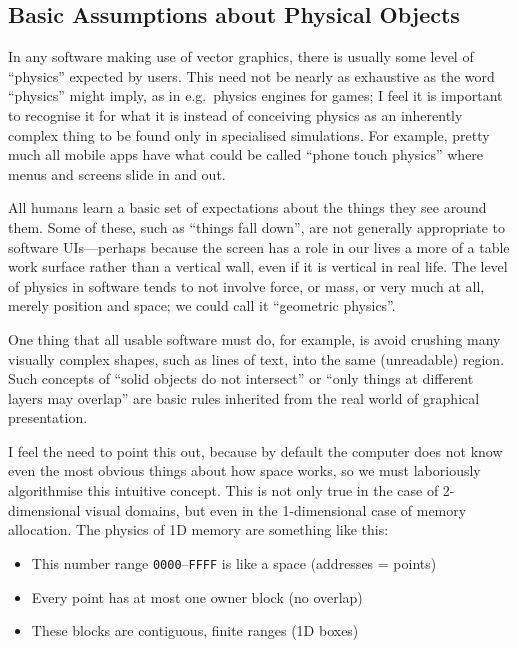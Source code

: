 \hypertarget{basic-assumptions-about-physical-objects}{%
\subsection{Basic Assumptions about Physical
Objects}\label{basic-assumptions-about-physical-objects}}

In any software making use of vector graphics, there is usually some
level of ``physics'' expected by users. This need not be nearly as
exhaustive as the word ``physics'' might imply, as in e.g.~physics
engines for games; I feel it is important to recognise it for what it is
instead of conceiving physics as an inherently complex thing to be found
only in specialised simulations. For example, pretty much all mobile
apps have what could be called ``phone touch physics'' where menus and
screens slide in and out.

All humans learn a basic set of expectations about the things they see
around them. Some of these, such as ``things fall down'', are not
generally appropriate to software UIs---perhaps because the screen has a
role in our lives a more of a table work surface rather than a vertical
wall, even if it is vertical in real life. The level of physics in
software tends to not involve force, or mass, or very much at all,
merely position and space; we could call it ``geometric physics''.

One thing that all usable software must do, for example, is avoid
crushing many visually complex shapes, such as lines of text, into the
same (unreadable) region. Such concepts of ``solid objects do not
intersect'' or ``only things at different layers may overlap'' are basic
rules inherited from the real world of graphical presentation.

I feel the need to point this out, because by default the computer does
not know even the most obvious things about how space works, so we must
laboriously algorithmise this intuitive concept. This is not only true
in the case of 2-dimensional visual domains, but even in the
1-dimensional case of memory allocation. The physics of 1D memory are
something like this:

\begin{itemize}
\tightlist
\item
  This number range \texttt{0000}--\texttt{FFFF} is like a space
  (addresses = points)
\item
  Every point has at most one owner block (no overlap)
\item
  These blocks are contiguous, finite ranges (1D boxes)
\end{itemize}

